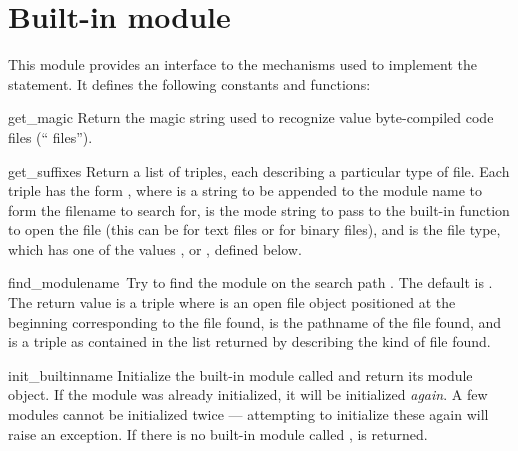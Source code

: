 \section{Built-in module }

This module provides an interface to the mechanisms used to implement
the  statement.  It defines the following constants and
functions:

\renewcommand{\indexsubitem}{(in module struct)}

\begin{funcdesc}{get_magic}{}
Return the magic string used to recognize value byte-compiled code
files (`` files'').
\end{funcdesc}

\begin{funcdesc}{get_suffixes}{}
Return a list of triples, each describing a particular type of file.
Each triple has the form , where  is a string to be appended to the
module name to form the filename to search for,  is the mode
string to pass to the built-in  function to open the file
(this can be  for text files or  for binary
files), and  is the file type, which has one of the values
,  or , defined
below.
\end{funcdesc}

\begin{funcdesc}{find_module}{name\, }
Try to find the module  on the search path .  The
default  is .  The return value is a triple
 where
 is an open file object positioned at the beginning
corresponding to the file found,  is the pathname of the
file found, and  is a triple as contained in the list
returned by  describing the kind of file found.
\end{funcdesc}

\begin{funcdesc}{init_builtin}{name}
Initialize the built-in module called  and return its module
object.  If the module was already initialized, it will be initialized
{\em again}.  A few modules cannot be initialized twice --- attempting
to initialize these again will raise an  exception.
If there is no
built-in module called ,  is returned.
\end{funcdesc}

